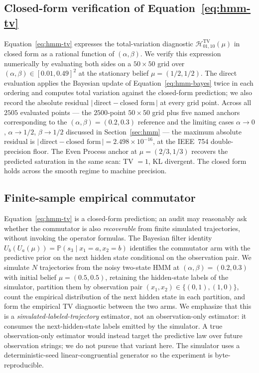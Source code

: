 \documentclass[11pt,a4paper]{article}
\theoremstyle{plain}
\theoremstyle{definition}
\theoremstyle{remark}
\newcommand{\Prob}{\mathbb{P}}
\begin{document}
\subsection{Closed-form verification of Equation~\eqref{eq:hmm-tv}}
\label{subsec:closed-form-verify}

Equation~\eqref{eq:hmm-tv} expresses the total-variation diagnostic $\mathcal{H}^{\mathrm{TV}}_{01,10}(\mu)$ in closed form as a rational function of $(\alpha, \beta)$. We verify this expression numerically by evaluating both sides on a $50 \times 50$ grid over $(\alpha, \beta) \in [0.01, 0.49]^2$ at the stationary belief $\mu = (1/2, 1/2)$. The direct evaluation applies the Bayesian update of Equation~\eqref{eq:hmm-bayes} twice in each ordering and computes total variation against the closed-form prediction; we also record the absolute residual $|\,\text{direct} - \text{closed form}\,|$ at every grid point. Across all $2505$ evaluated points --- the $2500$-point $50 \times 50$ grid plus five named anchors corresponding to the $(\alpha, \beta) = (0.2, 0.3)$ reference and the limiting cases $\alpha \to 0$, $\alpha \to 1/2$, $\beta \to 1/2$ discussed in Section~\ref{sec:hmm} --- the maximum absolute residual is $|\,\text{direct} - \text{closed form}\,| = 2.498 \times 10^{-16}$, at the IEEE~754 double-precision floor. The Even Process anchor at $\mu = (2/3, 1/3)$ recovers the predicted saturation in the same scan: TV $= 1$, KL divergent. The closed form holds across the smooth regime to machine precision.

\subsection{Finite-sample empirical commutator}
\label{subsec:finite-sample}

Equation~\eqref{eq:hmm-tv} is a closed-form prediction; an audit may reasonably ask whether the commutator is also \emph{recoverable} from finite simulated trajectories, without invoking the operator formulas. The Bayesian filter identity $U_b(U_a(\mu)) = \Prob(s_3 \mid x_1 = a, x_2 = b)$ identifies the commutator arm with the predictive prior on the next hidden state conditional on the observation pair. We simulate $N$ trajectories from the noisy two-state HMM at $(\alpha, \beta) = (0.2, 0.3)$ with initial belief $\mu = (0.5, 0.5)$, retaining the hidden-state labels of the simulator, partition them by observation pair $(x_1, x_2) \in \{(0,1), (1,0)\}$, count the empirical distribution of the next hidden state in each partition, and form the empirical TV diagnostic between the two arms. We emphasize that this is a \emph{simulated-labeled-trajectory} estimator, not an observation-only estimator: it consumes the next-hidden-state labels emitted by the simulator. A true observation-only estimator would instead target the predictive law over future observation strings; we do not pursue that variant here. The simulator uses a deterministic-seed linear-congruential generator so the experiment is byte-reproducible.
\end{document}
